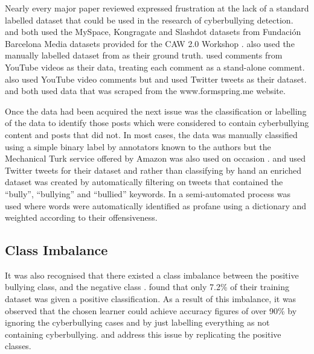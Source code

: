 Nearly every major paper reviewed expressed frustration at the lack of a standard labelled dataset that could be used in the research of cyberbullying detection. \citet{yin_detection_2009} and \citet{nahar_effective_2013} both used the MySpace, Kongragate and Slashdot datasets from Fundación Barcelona Media datasets provided for the CAW 2.0 Workshop \cite{fundacion_barcelona_media_fbm_caw_2009}. \citet{nahar_effective_2013} also used the manually labelled dataset from \citet{yin_detection_2009} as their ground truth. \citet{dinakar_modeling_2011} used comments from YouTube videos as their data, treating each comment as a stand-alone comment. \citet{dadvar_improving_2013} also used YouTube video comments but \citet{xu_fast_2012} and \citet{xu_learning_2012} used Twitter tweets as their dataset.  \citet{kontostathis_detecting_2013} and \citet{reynolds_using_2011} both used data that was scraped from the www.formspring.me website.

Once the data had been acquired the next issue was the classification or labelling of the data to identify those posts which were considered to contain cyberbullying content and posts that did not. In most cases, the data was manually classified using a simple binary label \cite{dadvar_towards_2012} \cite{dadvar_improving_2013}  \cite{dinakar_modeling_2011} \cite{yin_detection_2009} by annotators known to the authors but the Mechanical Turk service offered by Amazon was also used on occasion  \cite{kontostathis_detecting_2013} \cite{reynolds_using_2011}. \citet{xu_fast_2012} and \citet{xu_learning_2012} used Twitter tweets for their dataset and rather than classifying by hand an enriched dataset was created by automatically filtering on tweets that contained the ``bully'', ``bullying'' and ``bullied'' keywords. In \citet{chen_detecting_2012} a semi-automated process was used where words were automatically identified as profane using a dictionary and weighted according to their offensiveness.

\subsection{Class Imbalance}

It was also recognised that there existed a class imbalance between the positive bullying class, and the negative class \cite{dadvar_towards_2012} \cite{chen_detecting_2012}. \citet{reynolds_using_2011} found that only 7.2\% of their training dataset was given a positive classification. As a result of this imbalance, it was observed that the chosen learner could achieve accuracy figures of over 90\% by ignoring the cyberbullying cases and by just labelling everything as not containing cyberbullying. \citet{yin_detection_2009} and \citet{reynolds_using_2011} address this issue by replicating the positive classes.

